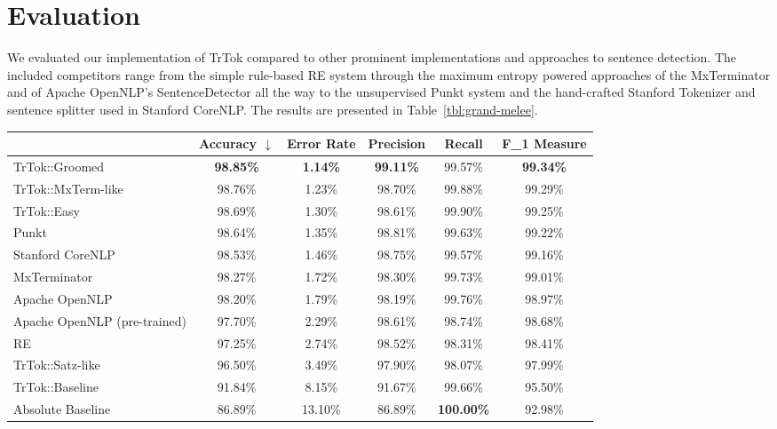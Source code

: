 \section{Evaluation}
\label{sec:eval}

We evaluated our implementation of TrTok compared to other prominent
implementations and approaches to sentence detection. The included
competitors range from the simple rule-based RE system through the
maximum entropy powered approaches of the MxTerminator and of Apache
OpenNLP's SentenceDetector all the way to the unsupervised Punkt
system and the hand-crafted Stanford Tokenizer and sentence splitter
used in Stanford CoreNLP. The results are presented in
Table~\ref{tbl:grand-melee}.

\begin{table*}
  \begin{center}
    \begin{tabular}{ | l | c | c | c | c | c | }
      \hline
      & Accuracy $\downarrow$ & Error Rate & Precision
      & Recall & F_1 Measure \\ \hline
      TrTok::Groomed & \textbf{98.85\%} & \textbf{1.14\%} & \textbf{99.11\%}
                     & 99.57\% & \textbf{99.34\%} \\ \hline
      TrTok::MxTerm-like & 98.76\% & 1.23\% & 98.70\%
                         & 99.88\% & 99.29\% \\ \hline
      TrTok::Easy & 98.69\% & 1.30\% & 98.61\%
                  & 99.90\% & 99.25\% \\ \hline
      Punkt & 98.64\% & 1.35\% & 98.81\%
            & 99.63\% & 99.22\% \\ \hline
      Stanford CoreNLP & 98.53\% & 1.46\% & 98.75\%
                       & 99.57\% & 99.16\% \\ \hline
      MxTerminator & 98.27\% & 1.72\% & 98.30\%
                   & 99.73\% & 99.01\% \\ \hline
      Apache OpenNLP & 98.20\% & 1.79\% & 98.19\%
                     & 99.76\% & 98.97\% \\ \hline
      Apache OpenNLP (pre-trained) & 97.70\% & 2.29\% & 98.61\%
                                   & 98.74\% & 98.68\% \\ \hline
      RE & 97.25\% & 2.74\% & 98.52\%
         & 98.31\% & 98.41\% \\ \hline
      TrTok::Satz-like & 96.50\% & 3.49\% & 97.90\%
                       & 98.07\% & 97.99\% \\ \hline
      TrTok::Baseline & 91.84\% & 8.15\% & 91.67\%
                      & 99.66\% & 95.50\% \\ \hline
      Absolute Baseline & 86.89\% & 13.10\% & 86.89\%
                        & \textbf{100.00\%} & 92.98\% \\ \hline
    \end{tabular}
  \end{center}
  \caption[Performance of sentence detectors on the Brown corpus]
    {The performance of the various sentence detectors on full
      stops from the Brown corpus testing data.}
  \label{tbl:grand-melee}
\end{table*}


